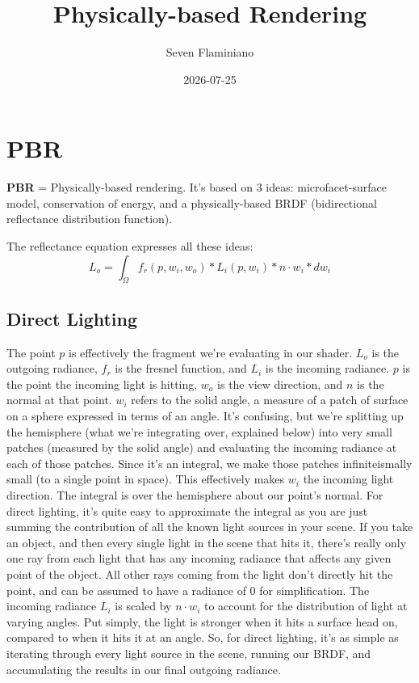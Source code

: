 \documentclass{article}
\title{Physically-based Rendering}
\author{Seven Flaminiano}
\date{2026-07-25}
\begin{document}
\maketitle
\tableofcontents{}

\section{PBR}
\textbf{PBR} = Physically-based rendering. It's based on 3 ideas: microfacet-surface model, conservation of energy, and a physically-based BRDF (bidirectional reflectance distribution function).

The reflectance equation expresses all these ideas:
\[L_o = \int_{\Omega} f_r(p, w_i, w_o) * L_i(p, w_i) * n \cdot w_i * dw_i\]

\subsection{Direct Lighting}

The point \(p\) is effectively the fragment we're evaluating in our shader. 
\(L_o\) is the outgoing radiance, \(f_r\) is the fresnel function, and \(L_i\) is the incoming radiance.
\(p\) is the point the incoming light is hitting, \(w_o\) is the view direction, and \(n\) is the normal at that point.
\(w_i\) refers to the solid angle, a measure of a patch of surface on a sphere expressed in terms of an angle.
It's confusing, but we're splitting up the hemisphere (what we're integrating over, explained below) into very small patches (measured by the solid angle)
and evaluating the incoming radiance at each of those patches. Since it's an integral, we make those patches infiniteismally small (to a single point in space). This effectively makes
\(w_i\) the incoming light direction. The integral is over the hemisphere about our point's normal. For direct lighting,
it's quite easy to approximate the integral as you are just summing the contribution of all the known light sources in your scene. If you take an object, and then every single light in the scene that 
hits it, there's really only one ray from each light that has any incoming radiance that affects any given point of the object. All other rays coming from the light don't directly hit
the point, and can be assumed to have a radiance of \(0\) for simplification. The incoming radiance \(L_i\) is scaled by \(n \cdot w_i\) to account for the distribution of light at varying angles. 
Put simply, the light is stronger when it hits a surface head on, compared to when it hits it at an angle. So, for direct lighting, 
it's as simple as iterating through every light source in the scene, running our BRDF, and accumulating the results in our final outgoing radiance.
\end{document}

